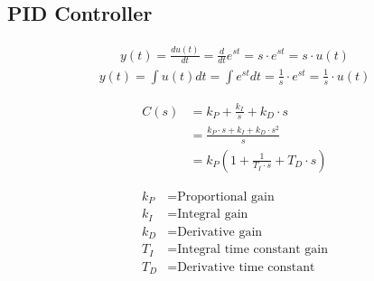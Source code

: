 \subsection{PID Controller}
        \begin{align*}
            y(t) = \frac{d u(t)}{dt} = \frac{d}{dt} e^{st} = s \cdot e^{st} = s \cdot u(t)
        \end{align*}
        \begin{align*}
            y(t) = \int u(t) dt = \int e^{st} dt = \frac{1}{s} \cdot e^{st} = \frac{1}{s} \cdot u(t)
        \end{align*}

        \begin{minipage}{0.49\linewidth}
            \begin{align*}
                C(s) &= k_P + \frac{k_I}{s} + k_D \cdot s\\
                &= \frac{k_P \cdot s + k_I + k_D \cdot s^2}{s}\\
                &= k_P(1 + \frac{1}{T_I \cdot s} + T_D \cdot s)
            \end{align*}
        \end{minipage}
        \begin{minipage}{0.49\linewidth}
            \begin{scriptsize}
                \begin{align*}
                    k_P &= \text{Proportional gain}\\
                    k_I &= \text{Integral gain}\\
                    k_D &= \text{Derivative gain}\\
                    T_I &= \text{Integral time constant gain}\\
                    T_D &= \text{Derivative time constant}
                \end{align*}
            \end{scriptsize}
        \end{minipage}
